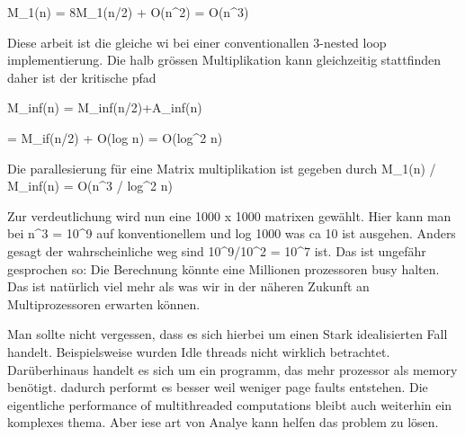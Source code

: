 M_1(n) = 8M_1(n/2) + O(n^2)
= O(n^3)


Diese arbeit ist die gleiche wi bei einer conventionallen 3-nested loop implementierung. Die halb grössen Multiplikation kann gleichzeitig stattfinden daher ist der kritische pfad

M_inf(n) = M_inf(n/2)+A_inf(n)

= M_if(n/2) + O(log n)
= O(log^2 n)

Die parallesierung für eine Matrix multiplikation ist gegeben durch M_1(n) / M_inf(n) = O(n^3 / log^2 n)


Zur verdeutlichung wird nun eine 1000 x 1000 matrixen gewählt. Hier kann man bei 
n^3 = 10^9 
auf konventionellem und log 1000 was ca 10 ist ausgehen. Anders gesagt der wahrscheinliche weg sind 
10^9/10^2 = 10^7 
ist. Das ist ungefähr gesprochen so: Die Berechnung könnte eine Millionen prozessoren busy halten. Das ist natürlich viel mehr als was wir in der näheren Zukunft an Multiprozessoren erwarten können. 


Man sollte nicht vergessen, dass es sich hierbei um einen Stark idealisierten Fall handelt. Beispielsweise wurden Idle threads nicht wirklich betrachtet. Darüberhinaus handelt es sich um ein programm, das mehr prozessor als memory benötigt. dadurch performt es besser weil weniger page faults entstehen. Die eigentliche performance of multithreaded computations bleibt auch weiterhin ein komplexes thema. Aber iese art von Analye kann helfen das problem zu lösen.